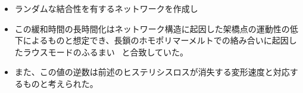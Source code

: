 \begin{columns}[totalwidth=.85\linewidth]
    \column{\textwidth}
        \begin{itemize}
            \item ランダムな結合性を有するネットワークを作成し
            \item この緩和時間の長時間化はネットワーク構造に起因した架橋点の運動性の低下によるものと想定でき、長鎖のホモポリマーメルトでの絡み合いに起因したラウスモードのふるまい~\cite{rubinstein} と合致していた。
            \item また、この値の逆数は前述のヒステリシスロスが消失する変形速度と対応するものと考えられた。
        \end{itemize}
    \end{columns}